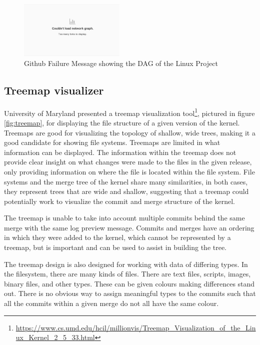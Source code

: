 \documentclass[conference, draftclsnofoot]{IEEEtran}
\begin{document}
\begin{figure}[h!]
	\centering
	\includegraphics[width=0.45\textwidth]{figures/github_viewer.png}
	\caption{Github Failure Message showing the DAG of the Linux Project}
	\label{fig:gitfail}
\end{figure}


\subsection{Treemap visualizer}
University of Maryland presented a treemap visualization
tool\footnote{\url{https://www.cs.umd.edu/hcil/millionvis/Treemap_Visualization_of_the_Linux_Kernel_2_5_33.html}},
pictured in figure \ref{fig:treemap}, for
displaying the file structure of a given version of the kernel. Treemaps are good
for visualizing the topology of shallow, wide trees, making it a good candidate for
showing file systems. Treemaps are limited in what information can be displayed. The
information within the treemap does not provide clear insight on what changes were
made to the files in the given release, only providing information on where the file
is located within the file system.  File systems and the merge tree of the kernel
share many similarities, in both cases, they represent trees that are wide and
shallow, suggesting that a treemap could potentially work to visualize the commit
and merge structure of the kernel.

The treemap is unable to take into account multiple commits behind the same merge
with the same log preview message. Commits and merges have an ordering in which they
were added to the kernel, which cannot be represented by a treemap, but is important
and can be used to assist in building the tree.

The treemap design is also designed for working with data of differing types.
In the filesystem, there are many kinds of files. There are text files,
scripts, images, binary files, and other types. These can be given colours
making differences stand out. There is no obvious way to assign meaningful
types to the commits such that all the commits within a given merge do not all
have the same colour.
\end{document}
